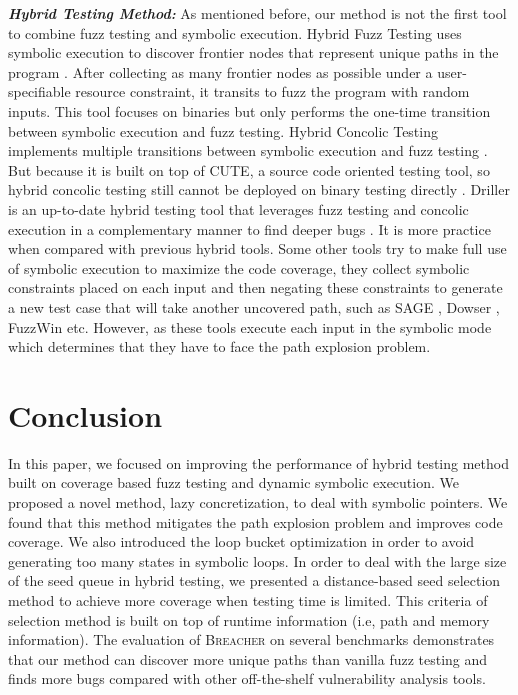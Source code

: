 \documentclass{cta-author}
\newcommand{\prototype}{\textsc{Breacher} }
\begin{document}
\noindent\textit{\textbf{Hybrid Testing Method:}}
As mentioned before, our method is not the first tool to combine fuzz testing and symbolic execution. Hybrid Fuzz Testing uses symbolic execution to discover frontier nodes that represent unique paths in the program \cite{pak2012hybrid}. After collecting as many frontier nodes as possible under a user-specifiable resource constraint, it transits to fuzz the program with random inputs. This tool focuses on binaries but only performs the one-time transition between symbolic execution and fuzz testing. Hybrid Concolic Testing implements multiple transitions between symbolic execution and fuzz testing \cite{majumdar2007hybrid}. But because it is built on top of CUTE, a source code oriented testing tool, so hybrid concolic testing still cannot be deployed on binary testing directly \cite{sen2005cute}. Driller is an up-to-date hybrid testing tool that leverages fuzz testing and concolic execution in a complementary manner to find deeper bugs \cite{stephens2016driller}. It is more practice when compared with previous hybrid tools. Some other tools try to make full use of symbolic execution to maximize the code coverage, they collect symbolic constraints placed on each input and then negating these constraints to generate a new test case that will take another uncovered path, such as SAGE \cite{godefroid2012sage}, Dowser \cite{haller2013dowsing}, FuzzWin \cite{online:fuzzwin} etc. However, as these tools execute each input in the symbolic mode which determines that they have to face the path explosion problem. 

\section{Conclusion} \label{sec:conclusion}
In this paper, we focused on improving the performance of hybrid 
testing method built on coverage based fuzz testing and dynamic 
symbolic execution. We proposed a novel method, lazy concretization, 
to deal with symbolic pointers. We found that this method mitigates 
the path explosion problem and improves code coverage. We also introduced 
the loop bucket optimization in order to avoid generating too many 
states in symbolic loops. In order to deal with the large size of 
the seed queue in hybrid testing, we presented a distance-based seed 
selection method to achieve more coverage when testing time is limited. 
This criteria of selection method is built on top of runtime information 
(i.e, path and memory information). The evaluation of \prototype 
on several benchmarks demonstrates that our method can discover more 
unique paths than vanilla fuzz testing and finds more bugs compared 
with other off-the-shelf vulnerability analysis tools.




\vfill\pagebreak
\end{document}
